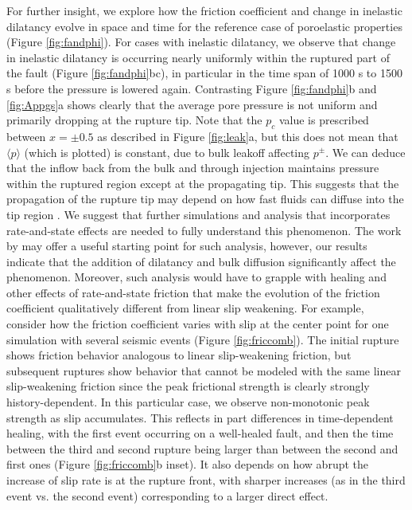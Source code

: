 \documentclass[draft]{agujournal2019}
\begin{document}
For further insight, we explore how the friction coefficient and change in inelastic dilatancy evolve in space and time for the reference case of poroelastic properties (Figure \ref{fig:fandphi}). For cases with inelastic dilatancy, we observe that change in inelastic dilatancy is occurring nearly uniformly within the ruptured part of the fault (Figure \ref{fig:fandphi}bc), in particular in the time span of 1000 s to 1500 s before the pressure is lowered again. Contrasting Figure \ref{fig:fandphi}b and \ref{fig:Appgs}a shows clearly that the average pore pressure is not uniform and primarily dropping at the rupture tip. Note that the $p_c$ value is prescribed between $x = \pm 0.5$ as described in Figure \ref{fig:leak}a, but this does not mean that $\langle p \rangle$ (which is plotted) is constant, due to bulk leakoff affecting $p^\pm$. We can deduce that the inflow back from the bulk and through injection maintains pressure within the ruptured region except at the propagating tip. This suggests that the propagation of the rupture tip may depend on how fast fluids can diffuse into the tip region \cite{Ciardo2019,Brantut2021}. We suggest that further simulations and analysis that incorporates rate-and-state effects are needed to fully understand this phenomenon. The work by  may offer a useful starting point for such analysis, however, our results indicate that the addition of dilatancy and bulk diffusion significantly affect the phenomenon. Moreover, such analysis would have to grapple with healing and other effects of rate-and-state friction that make the evolution of the friction coefficient qualitatively different from linear slip weakening.  For example, consider how the friction coefficient varies with slip at the center point for one simulation with several seismic events (Figure \ref{fig:friccomb}). The initial rupture shows friction behavior analogous to linear slip-weakening friction, but subsequent ruptures show behavior that cannot be modeled with the same linear slip-weakening friction since the peak frictional strength is clearly strongly history-dependent. In this particular case, we observe non-monotonic peak strength as slip accumulates. This reflects in part differences in time-dependent healing, with the first event occurring on a well-healed fault, and then the time between the third and second rupture being larger than between the second and first ones (Figure \ref{fig:friccomb}b inset).  It also depends on how abrupt the increase of slip rate is at the rupture front, with sharper increases (as in the third event vs. the second event) corresponding to a larger direct effect.  
\end{document}

